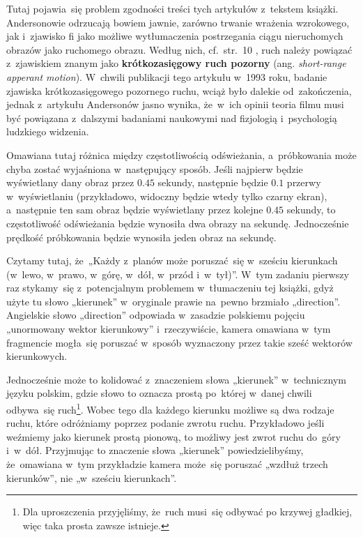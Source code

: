 \documentclass[a4paper,11pt]{article}
\numberwithin{equation}{section}
\begin{document}
Tutaj pojawia~się problem zgodności treści tych artykułów z~tekstem książki.
Andersonowie odrzucają bowiem jawnie, zarówno trwanie wrażenia wzrokowego,
jak i~zjawisko fi jako możliwe wytłumaczenia postrzegania ciągu nieruchomych
obrazów jako ruchomego obrazu. Według nich, cf.~str.~10
\parencite{Anderson-Anderson-The-Myth-of-Persistence-of-Vision-ETC-Pub-1993},
ruch należy powiązać z~zjawiskiem znanym jako \textbf{krótkozasięgowy
  ruch pozorny} (ang. \textit{short-range apperant motion}). W~chwili
publikacji tego artykułu w~1993 roku, badanie zjawiska krótkozasięgowego
pozornego ruchu, wciąż było dalekie od~zakończenia, jednak z~artykułu
Andersonów jasno wynika, że~w~ich opinii teoria filmu musi być powiązana
z~dalszymi badaniami naukowymi nad fizjologią i~psychologią ludzkiego
widzenia.

\VerSpaceFour





\noindent
{} Omawiana tutaj różnica między częstotliwością odświeżania,
a~próbkowania może chyba zostać wyjaśniona w~następujący sposób. Jeśli
najpierw będzie wyświetlany dany obraz przez $0.45$ sekundy, następnie
będzie $0.1$ przerwy w~wyświetlaniu (przykładowo, widoczny będzie
wtedy tylko czarny ekran), a~następnie ten sam obraz będzie wyświetlany
przez kolejne $0.45$ sekundy, to częstotliwość odświeżania będzie wynosiła
dwa obrazy na sekundę. Jednocześnie prędkość próbkowania będzie wynosiła
jeden obraz na sekundę.

\VerSpaceFour



\noindent
{} Czytamy tutaj, że~„Każdy z~planów może poruszać~się
w~sześciu kierunkach (w~lewo, w~prawo, w~górę, w~dół, w~przód i~w~tył)”.
W~tym zadaniu pierwszy raz stykamy~się z~potencjalnym problemem w~tłumaczeniu
tej książki, gdyż użyte tu słowo „kierunek” w~oryginale prawie na~pewno
brzmiało „direction”. Angielskie słowo „direction” odpowiada w~zasadzie
polskiemu pojęciu „unormowany wektor kierunkowy” i~rzeczywiście, kamera
omawiana w~tym fragmencie mogła~się poruszać w~sposób wyznaczony przez
takie sześć wektorów kierunkowych.

Jednocześnie może to kolidować z~znaczeniem słowa „kierunek” w~technicznym
języku polskim, gdzie słowo to oznacza prostą po~której w~danej chwili
odbywa~się ruch\footnote{Dla uproszczenia przyjęliśmy, że~ruch musi~się
  odbywać po krzywej gładkiej, więc taka prosta zawsze istnieje.}. Wobec
tego dla każdego kierunku możliwe są dwa rodzaje ruchu, które odróżniamy
poprzez podanie zwrotu ruchu. Przykładowo jeśli weźmiemy jako kierunek
prostą pionową, to możliwy jest zwrot ruchu do~góry i~w~dół. Przyjmując to
znaczenie słowa „kierunek” powiedzielibyśmy, że~omawiana w~tym przykładzie
kamera może~się poruszać „wzdłuż trzech kierunków”, nie „w~sześciu
kierunkach”.
\end{document}
